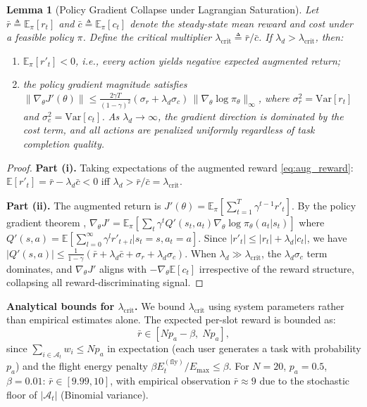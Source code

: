 \documentclass[journal]{IEEEtran}
\newtheorem{lemma}{Lemma}
\newcommand{\ld}{\lambda_d}
\begin{document}
\begin{lemma}[Policy Gradient Collapse under Lagrangian Saturation]
\label{lem:rpc}
Let $\bar{r} \triangleq \mathbb{E}_\pi[r_t]$ and
$\bar{c} \triangleq \mathbb{E}_\pi[c_t]$ denote the steady-state
mean reward and cost under a feasible policy $\pi$.
Define the \emph{critical multiplier}
$\lambda_{\text{crit}} \triangleq \bar{r}/\bar{c}$.
If $\ld > \lambda_{\text{crit}}$, then:
\begin{enumerate}
  \item[(i)] $\mathbb{E}_\pi[r'_t] < 0$, i.e., every action yields
    negative expected augmented return;
  \item[(ii)] the policy gradient magnitude satisfies
    $\|\nabla_\theta J'(\theta)\| \le
      \frac{2 \gamma T}{(1-\gamma)^2}
      (\sigma_r + \ld \sigma_c)\,
      \|\nabla_\theta \log \pi_\theta\|_\infty$,
    where $\sigma_r^2 = \text{Var}[r_t]$ and
    $\sigma_c^2 = \text{Var}[c_t]$.
    As $\ld \to \infty$, the gradient direction is dominated
    by the cost term, and \emph{all actions are penalized
    uniformly regardless of task completion quality}.
\end{enumerate}
\end{lemma}
\begin{proof}
\textbf{Part (i).}
Taking expectations of the augmented reward \eqref{eq:aug_reward}:
$\mathbb{E}[r'_t] = \bar{r} - \ld \bar{c} < 0$
iff $\ld > \bar{r}/\bar{c} = \lambda_{\text{crit}}$.

\textbf{Part (ii).}
The augmented return is $J'(\theta) = \mathbb{E}_\pi[\sum_{t=1}^T \gamma^{t-1} r'_t]$.
By the policy gradient theorem \cite{sutton2018rl_book},
$\nabla_\theta J' = \mathbb{E}_\pi[\sum_t \gamma^t
  Q'(s_t,a_t) \nabla_\theta \log\pi_\theta(a_t|s_t)]$
where $Q'(s,a) = \mathbb{E}[\sum_{l=0}^\infty \gamma^l r'_{t+l} | s_t{=}s, a_t{=}a]$.
Since $|r'_t| \le |r_t| + \ld |c_t|$, we have
$|Q'(s,a)| \le \frac{1}{1-\gamma}(\bar{r} + \ld \bar{c}
  + \sigma_r + \ld \sigma_c)$.
When $\ld \gg \lambda_{\text{crit}}$, the $\ld \sigma_c$ term
dominates, and $\nabla_\theta J'$ aligns with
$-\nabla_\theta \mathbb{E}[c_t]$ irrespective of the reward
structure, collapsing all reward-discriminating signal.
\end{proof}

\noindent\textbf{Analytical bounds for $\lambda_{\text{crit}}$.}
We bound $\lambda_{\text{crit}}$ using system parameters rather
than empirical estimates alone.
The expected per-slot reward is bounded as:
\begin{equation}
  \bar{r} \in \left[N p_a - \beta,\; N p_a\right],
  \label{eq:rbar_bound}
\end{equation}
since $\sum_{i \in \mathcal{A}_t} w_i \le N p_a$ in expectation
(each user generates a task with probability $p_a$) and the
flight energy penalty $\beta E_t^{(\text{fly})}/E_{\max} \le \beta$.
For $N{=}20$, $p_a{=}0.5$, $\beta{=}0.01$:
$\bar{r} \in [9.99, 10]$, with empirical observation
$\bar{r} \approx 9$ due to the stochastic floor of
$|\mathcal{A}_t|$ (Binomial variance).
\end{document}
